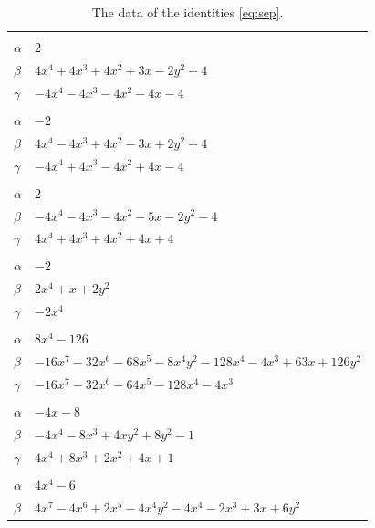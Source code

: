 \documentclass[11pt]{article}
\begin{document}
\begingroup\footnotesize
\setlength{\LTcapwidth}{\textwidth}
\begin{longtable}{@{}ll@{}}
\caption{The data of the identities \eqref{eq:sep}.}\label{tab:sep}\\
\hline\endfirsthead\hline\endhead\hline\endfoot
\multicolumn{2}{@{}l}{$\{i,j\}=\{0,3\}$, $k_{ij}=2$}\\
$\alpha$ & $2$\\
$\beta$ & $4x^{4}+4x^{3}+4x^{2}+3x-2y^{2}+4$\\
$\gamma$ & $-4x^{4}-4x^{3}-4x^{2}-4x-4$\\
\addlinespace[3pt]
\multicolumn{2}{@{}l}{$\{i,j\}=\{0,6\}$, $k_{ij}=2\cdot 3$}\\
$\alpha$ & $-2$\\
$\beta$ & $4x^{4}-4x^{3}+4x^{2}-3x+2y^{2}+4$\\
$\gamma$ & $-4x^{4}+4x^{3}-4x^{2}+4x-4$\\
\addlinespace[3pt]
\multicolumn{2}{@{}l}{$\{i,j\}=\{0,7\}$, $k_{ij}=2$}\\
$\alpha$ & $2$\\
$\beta$ & $-4x^{4}-4x^{3}-4x^{2}-5x-2y^{2}-4$\\
$\gamma$ & $4x^{4}+4x^{3}+4x^{2}+4x+4$\\
\addlinespace[3pt]
\multicolumn{2}{@{}l}{$\{i,j\}=\{0,8\}$, $k_{ij}=2$}\\
$\alpha$ & $-2$\\
$\beta$ & $2x^{4}+x+2y^{2}$\\
$\gamma$ & $-2x^{4}$\\
\addlinespace[3pt]
\multicolumn{2}{@{}l}{$\{i,j\}=\{0,20\}$, $k_{ij}=2\cdot 3^{2}\cdot 7$}\\
$\alpha$ & $8x^{4}-126$\\
$\beta$ & $-16x^{7}-32x^{6}-68x^{5}-8x^{4}y^{2}-128x^{4}-4x^{3}+63x+126y^{2}$\\
$\gamma$ & $-16x^{7}-32x^{6}-64x^{5}-128x^{4}-4x^{3}$\\
\addlinespace[3pt]
\multicolumn{2}{@{}l}{$\{i,j\}=\{0,26\}$, $k_{ij}=7$}\\
$\alpha$ & $-4x-8$\\
$\beta$ & $-4x^{4}-8x^{3}+4xy^{2}+8y^{2}-1$\\
$\gamma$ & $4x^{4}+8x^{3}+2x^{2}+4x+1$\\
\addlinespace[3pt]
\multicolumn{2}{@{}l}{$\{i,j\}=\{0,27\}$, $k_{ij}=2\cdot 3$}\\
$\alpha$ & $4x^{4}-6$\\
$\beta$ & $4x^{7}-4x^{6}+2x^{5}-4x^{4}y^{2}-4x^{4}-2x^{3}+3x+6y^{2}$\\

\end{longtable}
\end{document}
